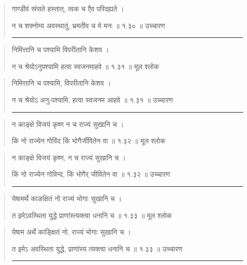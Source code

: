 \begin{quotation} 

गाण्डीवं स्रंसते हस्तात्, त्वक च एैव परिदह्यते  ।  

न च शक्नोम्य अवस्थातुं, भ्रमतीव च मे मनः  ॥ १.३० ॥  उच्चारण

\noindent\rule{16cm}{0.4pt} 
\end{quotation}


\begin{quotation} 

निमित्तानि च पश्यामि विपरीतानि केशव  ।  
 
न च श्रेयोऽनुपश्यामि हत्वा स्वजनमाहवे  ॥ १.३१ ॥  मूल श्लोक
\end{quotation}

\begin{quotation}

निमित्तानि च पश्यामि, विपरीतानि केशव  ।  
 
न च श्रेयोऽ अनु-पश्यामि, हत्वा स्वजनम आहवे  ॥ १.३१ ॥  उच्चारण

\noindent\rule{16cm}{0.4pt} 
\end{quotation}


\begin{quotation} 

न काङ्‍क्षे विजयं कृष्ण न च राज्यं सुखानि च  ।  
 
किं नो राज्येन गोविंद किं भोगैर्जीवितेन वा  ॥ १.३२ ॥  मूल श्लोक
\end{quotation}

\begin{quotation}

न काङ्क्षे विजयं कृष्ण, न च राज्यं सुखानि च  ।  
 
किं नो राज्येन गोविन्द, किं भोगैर् जीवितेन वा  ॥ १.३२ ॥  उच्चारण

\noindent\rule{16cm}{0.4pt} 
\end{quotation}


\begin{quotation} 

येषामर्थे काङक्षितं नो राज्यं भोगाः सुखानि च  ।  

त इमेऽवस्थिता युद्धे प्राणांस्त्यक्त्वा धनानि च  ॥ १.३३ ॥  मूल श्लोक
\end{quotation}

\begin{quotation}

येषाम अर्थे काङ्क्षितं नो, राज्यं भोगाः सुखानि च  ।  

त इमेऽ अवस्थिता युद्धे, प्राणांस्य त्यक्त्वा धनानि च  ॥ १.३३ ॥  उच्चारण

\noindent\rule{16cm}{0.4pt} 
\end{quotation}


